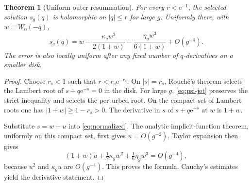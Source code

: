 \documentclass[11pt,a4paper]{article}
\numberwithin{equation}{section}
\newtheorem{theorem}{Theorem}[section]
\theoremstyle{definition}
\theoremstyle{remark}
\newcommand{\e}{\mathrm e}
\begin{document}
\begin{theorem}[Uniform outer resummation]
\label{thm:outer}
For every $r<\e^{-1}$, the selected solution $s_g(q)$ is holomorphic on $|q|\leq r$ for large $g$. Uniformly there, with $w=W_0(-q)$,
\begin{equation}
 s_g(q)=w-\frac{\kappa_gw^2}{2(1+w)}
          -\frac{\eta_gw^3}{6(1+w)}+O(g^{-4}).
 \label{eq:outer}
\end{equation}
The error is also locally uniform after any fixed number of $q$-derivatives on a smaller disk.
\end{theorem}
\begin{proof}
Choose $r_s<1$ such that $r<r_s\e^{-r_s}$. On $|s|=r_s$, Rouch\'e's theorem selects the Lambert root of $s+q\e^{-s}=0$ in the disk. For large $g$, \eqref{eq:psi-jet} preserves the strict inequality and selects the perturbed root. On the compact set of Lambert roots one has $|1+w|\geq1-r_s>0$. The derivative in $s$ of $s+q\e^{-s}$ at $w$ is $1+w$.

Substitute $s=w+u$ into \eqref{eq:normalized}. The analytic implicit-function theorem, uniformly on this compact set, first gives $u=O(g^{-2})$. Taylor expansion then gives
\[
 (1+w)u+\tfrac12\kappa_gw^2+\tfrac16\eta_gw^3=O(g^{-4}),
\]
because $u^2$ and $\kappa_gu$ are $O(g^{-4})$. This proves the formula. Cauchy's estimates yield the derivative statement.
\end{proof}
\end{document}
